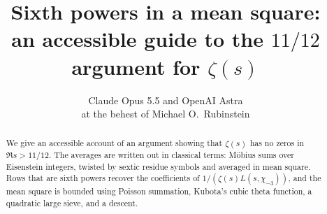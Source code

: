 \documentclass[11pt]{article}
\title{Sixth powers in a mean square:\\an accessible guide to the $11/12$ argument for $\zeta(s)$}
\author{Claude Opus 5.5 \quad and \quad OpenAI Astra\\[1ex]
{\normalsize at the behest of Michael O.\ Rubinstein}}
\date{}
\numberwithin{equation}{section}
\begin{document}
\maketitle
\begin{center}\setlength{\fboxsep}{6pt}
\end{center}
\begin{abstract}
We give an accessible account of an argument showing that $\zeta(s)$ has
no zeros in $\Re s>11/12$. The averages are written out in classical terms:
M\"obius sums over Eisenstein integers, twisted by sextic residue symbols
and averaged in mean square. Rows that are sixth powers recover the
coefficients of $1/(\zeta(s)L(s,\chi_{-3}))$, and the mean square is bounded
using Poisson summation, Kubota's cubic theta function, a quadratic large
sieve, and a descent.
\end{abstract}
\end{document}

